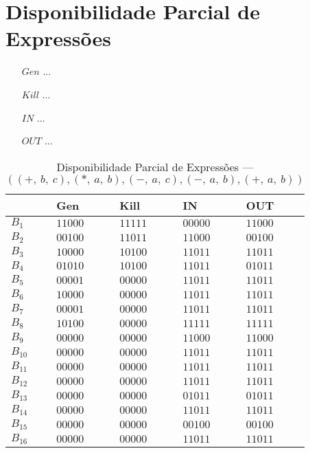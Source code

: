\section{Disponibilidade Parcial de Express\~oes}

\begin{itemize}
  \item[$Gen$] ...
  \item[$Kill$] ...
  \item[$IN$] ...
  \item[$OUT$] ...
\end{itemize}

\begin{table}[ht]
\centering
\begin{tabular}{l|l|l|l|l}
	& Gen & Kill & IN & OUT\\
\hline
$B_{1}$ &  $11000$ & $11111$ & $00000$ & $11000$\\
$B_{2}$ &  $00100$ & $11011$ & $11000$ & $00100$\\
$B_{3}$ &  $10000$ & $10100$ & $11011$ & $11011$\\
$B_{4}$ &  $01010$ & $10100$ & $11011$ & $01011$\\
$B_{5}$ &  $00001$ & $00000$ & $11011$ & $11011$\\
$B_{6}$ &  $10000$ & $00000$ & $11011$ & $11011$\\
$B_{7}$ &  $00001$ & $00000$ & $11011$ & $11011$\\
$B_{8}$ &  $10100$ & $00000$ & $11111$ & $11111$\\
$B_{9}$ &  $00000$ & $00000$ & $11000$ & $11000$\\
$B_{10}$ &  $00000$ & $00000$ & $11011$ & $11011$\\
$B_{11}$ &  $00000$ & $00000$ & $11011$ & $11011$\\
$B_{12}$ &  $00000$ & $00000$ & $11011$ & $11011$\\
$B_{13}$ &  $00000$ & $00000$ & $01011$ & $01011$\\
$B_{14}$ &  $00000$ & $00000$ & $11011$ & $11011$\\
$B_{15}$ &  $00000$ & $00000$ & $00100$ & $00100$\\
$B_{16}$ &  $00000$ & $00000$ & $11011$ & $11011$\\
\end{tabular}
\caption{Disponibilidade Parcial de Express\~oes --- $((+,\:b,\:c), (*,\:a,\:b), (-,\:a,\:c), (-,\:a,\:b), (+,\:a,\:b))$}
\end{table}

